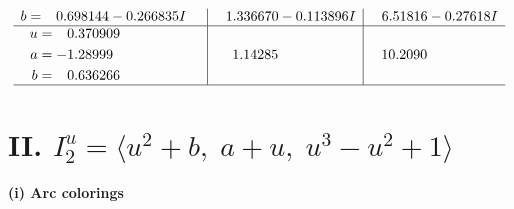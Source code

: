\documentclass[1p]{elsarticle_modified}
\theoremstyle{definition}
\begin{document}
$$\begin{array}{c|c|c}
\begin{aligned}
b &= \phantom{-}0.698144 - 0.266835 I\end{aligned}
 & \phantom{-}1.336670 - 0.113896 I & \phantom{-}6.51816 - 0.27618 I \\ \hline\begin{aligned}
u &= \phantom{-}0.370909\phantom{ +0.000000I} \\
a &= -1.28999\phantom{ +0.000000I} \\
b &= \phantom{-}0.636266\phantom{ +0.000000I}\end{aligned}
 & \phantom{-}1.14285\phantom{ +0.000000I} & \phantom{-}10.2090\phantom{ +0.000000I}\\
 \hline 
 \end{array}$$\newpage\newpage\renewcommand{\arraystretch}{1}
\centering \section*{II. $I^u_{2}= \langle u^2+b,\;a+u,\;u^3- u^2+1 \rangle$}
\flushleft \textbf{(i) Arc colorings}\\
\end{document}
